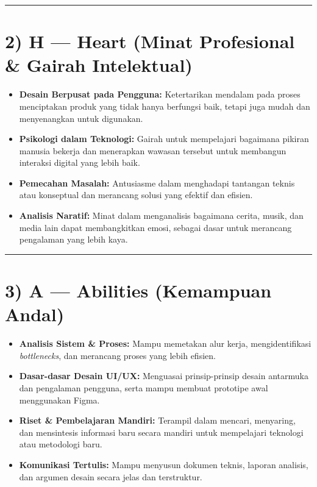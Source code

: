 \documentclass[
  letterpaper,
  DIV=11,
  numbers=noendperiod]{scrreprt}
\providecommand{\tightlist}{%
  \setlength{\itemsep}{0pt}\setlength{\parskip}{0pt}}
\begin{document}
\begin{center}\rule{0.5\linewidth}{0.5pt}\end{center}

\section{2) H --- Heart (Minat Profesional \& Gairah
Intelektual)}\label{h-heart-minat-profesional-gairah-intelektual}

\begin{itemize}
\tightlist
\item
  \textbf{Desain Berpusat pada Pengguna:} Ketertarikan mendalam pada
  proses menciptakan produk yang tidak hanya berfungsi baik, tetapi juga
  mudah dan menyenangkan untuk digunakan.
\item
  \textbf{Psikologi dalam Teknologi:} Gairah untuk mempelajari bagaimana
  pikiran manusia bekerja dan menerapkan wawasan tersebut untuk
  membangun interaksi digital yang lebih baik.
\item
  \textbf{Pemecahan Masalah:} Antusiasme dalam menghadapi tantangan
  teknis atau konseptual dan merancang solusi yang efektif dan efisien.
\item
  \textbf{Analisis Naratif:} Minat dalam menganalisis bagaimana cerita,
  musik, dan media lain dapat membangkitkan emosi, sebagai dasar untuk
  merancang pengalaman yang lebih kaya.
\end{itemize}

\begin{center}\rule{0.5\linewidth}{0.5pt}\end{center}

\section{3) A --- Abilities (Kemampuan
Andal)}\label{a-abilities-kemampuan-andal}

\begin{itemize}
\tightlist
\item
  \textbf{Analisis Sistem \& Proses:} Mampu memetakan alur kerja,
  mengidentifikasi \emph{bottlenecks}, dan merancang proses yang lebih
  efisien.
\item
  \textbf{Dasar-dasar Desain UI/UX:} Menguasai prinsip-prinsip desain
  antarmuka dan pengalaman pengguna, serta mampu membuat prototipe awal
  menggunakan Figma.
\item
  \textbf{Riset \& Pembelajaran Mandiri:} Terampil dalam mencari,
  menyaring, dan mensintesis informasi baru secara mandiri untuk
  mempelajari teknologi atau metodologi baru.
\item
  \textbf{Komunikasi Tertulis:} Mampu menyusun dokumen teknis, laporan
  analisis, dan argumen desain secara jelas dan terstruktur.
\end{itemize}
\end{document}
